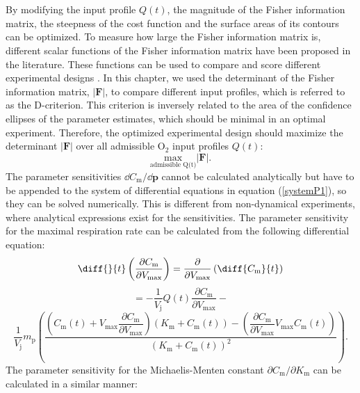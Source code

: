 \\
\\
By modifying the input profile $Q(t)$, the magnitude of the Fisher information matrix, the steepness of the cost function and the surface areas of its contours can be optimized. To measure how large the Fisher information matrix is, different scalar functions of the Fisher information matrix have been proposed in the literature. These functions can be used to compare and score different experimental designs \parencite{atkinson1}. In this chapter, we used the determinant of the Fisher information matrix, $|\mathbf{F}|$, to compare different input profiles, which is referred to as the D-criterion. This criterion is inversely related to the area of the confidence ellipses of the parameter estimates, which should be minimal in an optimal experiment. Therefore, the optimized experimental design should maximize the determinant $|\mathbf{F}|$ over all admissible $\text{O}_2$ input profiles $Q(t)$:
\begin{equation}
\underset{\text{admissible Q(t)}}{\text{max}}|\mathbf{F}|.
\end{equation}
The parameter sensitivities $\dd C_\text{m}/\dd \mathbf{p}$ cannot be calculated analytically but have to be appended to the system of differential equations in equation (\ref{systemP1}), so they can be solved numerically. This is different from non-dynamical experiments, where analytical expressions exist for the sensitivities. The parameter sensitivity for the maximal respiration rate can be calculated from the following differential equation:
\begin{equation}
\diff{}{t}\left(\dfrac{\partial C_\text{m}}{\partial V_{\text{max}}}\right) = 
\dfrac{\partial}{\partial V_{\text{max}}}\left(\diff{C_\text{m}}{t}\right)
\label{sens1}
\end{equation}
\begin{equation*}
=
 -\frac{ 1}{V_\text{j}}Q(t)\dfrac{\partial C_\text{m}}{\partial V_{\text{max}}}  -
\end{equation*}
\begin{equation*}
\frac{ 1}{V_\text{j}}m_\text{p}\left(\frac{ \left( C_\text{m}(t) + V_{\text{max}}\dfrac{\partial C_\text{m}}{\partial V_{\text{max}}}\right)\left(K_\text{m} + C_\text{m}(t)\right) - \left(\dfrac{\partial C_\text{m}}{\partial V_{\text{max}}}V_{\text{max}}C_\text{m}(t)\right)}{(K_\text{m} + C_\text{m}(t))^2}	
\right).
\end{equation*}
The parameter sensitivity for the Michaelis-Menten constant  $\partial C_\text{m}/\partial K_{\text{m}}$ can be calculated in a similar manner:

